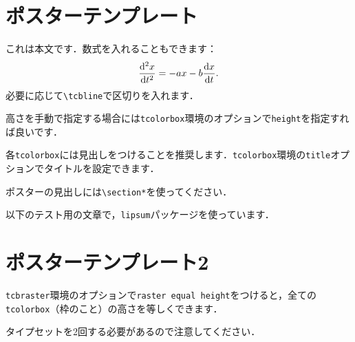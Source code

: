 \documentclass[12pt, a4j, dvipdfmx, sffamily]{jsarticle}
\begin{document}
\sffamily\gtfamily
\newpage
\section*{ポスターテンプレート}
\begin{tcbraster}[raster columns = 1]
	\begin{tcolorbox}[title = 本文・\texttt{\textbackslash tcbline}]
	これは本文です．数式を入れることもできます：
		\begin{equation}
		\dv[2]{x}{t}
		=-ax-b\dv{x}{t}.
		\end{equation}
	\tcbline
	必要に応じて\texttt{\textbackslash tcbline}で区切りを入れます．
	\end{tcolorbox}
	\begin{tcolorbox}[title = 高さ , height = 30mm]
	高さを手動で指定する場合には\texttt{tcolorbox}環境のオプションで\texttt{height}を指定すれば良いです．
	\end{tcolorbox}
	\begin{tcolorbox}[title = タイトルの指定]
	各\texttt{tcolorbox}には見出しをつけることを推奨します．\texttt{tcolorbox}環境の\texttt{title}オプションでタイトルを設定できます．
	\end{tcolorbox}
	\begin{tcolorbox}[title = ポスター見出し]
	ポスターの見出しには\texttt{\textbackslash section*}を使ってください．
	\end{tcolorbox}
	\begin{tcolorbox}[title = lipsum1]
	以下のテスト用の文章で，\texttt{lipsum}パッケージを使っています．
	\tcbline
	\lipsum[1]
	\end{tcolorbox}
\end{tcbraster}
\newpage
\section*{ポスターテンプレート2}
\begin{tcbraster}[raster columns = 1, raster equal height]
	\begin{tcolorbox}[title = \texttt{raster equal height}]
	\texttt{tcbraster}環境のオプションで\texttt{raster equal height}をつけると，全ての\texttt{tcolorbox}（枠のこと）の高さを等しくできます．
	
	タイプセットを2回する必要があるので注意してください．
	\end{tcolorbox}
	\begin{tcolorbox}[title = lipsum2]
	\lipsum[2]
	\end{tcolorbox}
	\begin{tcolorbox}[title = lipsum3]
	\lipsum[3]
	\end{tcolorbox}
\end{tcbraster}
\end{document}
